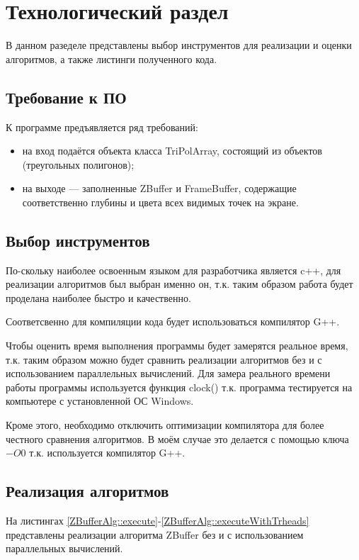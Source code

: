 \chapter{Технологический раздел}
В данном разеделе представлены выбор инструментов для реализации и оценки алгоритмов, а также листинги полученного кода.

\section{Требование к ПО}

К программе предъявляется ряд требований:

\begin{itemize}
	\item на вход подаётся объекта класса TriPolArray, состоящий из объектов (треугольных полигонов);
	\item на выходе — заполненные ZBuffer и FrameBuffer, содержащие соответственно глубины и цвета всех видимых точек на экране.
\end{itemize}

\section{Выбор инструментов}
По-скольку наиболее освоенным языком для разработчика является c++, для реализации алгоритмов был выбран именно он, т.к. таким образом работа будет проделана наиболее быстро и качественно.

Соответсвенно для компиляции кода будет использоваться компилятор G++.

Чтобы оценить время выполнения программы будет замерятся реальное время, т.к. таким образом можно будет сравнить реализации алгоритмов без и с использованием параллельных вычислений. Для замера реального времени работы программы используется функция clock() т.к. программа тестируется на компьютере с установленной ОС Windows.

Кроме этого, необходимо отключить оптимизации компилятора для более честного сравнения алгоритмов. В моём случае это делается с помощью ключа $-O0$ т.к. используется компилятор G++. \cite{optimization}

\section{Реализация алгоритмов}
На листингах \ref{ZBufferAlg::execute}-\ref{ZBufferAlg::executeWithTrheads} представлены реализации алгоритма ZBuffer без и с использованием параллельных вычислений.

